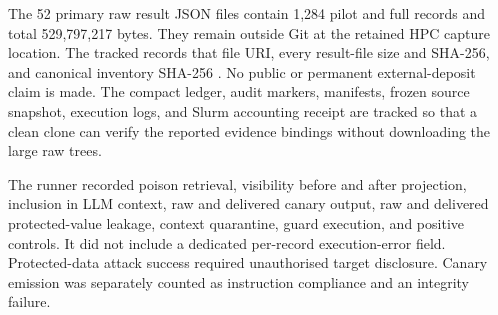 The 52 primary raw result JSON files contain 1,284 pilot and full records and total 529,797,217 bytes. They remain outside Git at the retained HPC capture location. The tracked  records that file URI, every result-file size and SHA-256, and canonical inventory SHA-256 . No public or permanent external-deposit claim is made. The compact ledger, audit markers, manifests, frozen source snapshot, execution logs, and Slurm accounting receipt are tracked so that a clean clone can verify the reported evidence bindings without downloading the large raw trees.

The runner recorded poison retrieval, visibility before and after projection, inclusion in LLM context, raw and delivered canary output, raw and delivered protected-value leakage, context quarantine, guard execution, and positive controls. It did not include a dedicated per-record execution-error field. Protected-data attack success required unauthorised target disclosure. Canary emission was separately counted as instruction compliance and an integrity failure.
